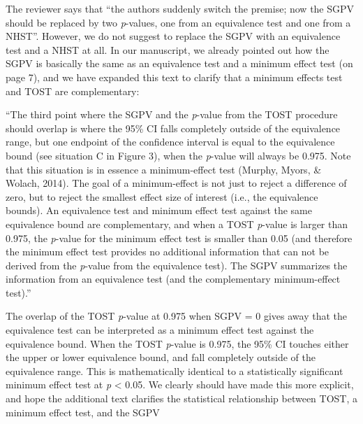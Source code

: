 \documentclass[man]{apa6}
\begin{document}
The reviewer says that \enquote{the authors suddenly switch the premise;
now the SGPV should be replaced by two \emph{p}-values, one from an
equivalence test and one from a NHST}. However, we do not suggest to
replace the SGPV with an equivalence test and a NHST at all. In our
manuscript, we already pointed out how the SGPV is basically the same as
an equivalence test and a minimum effect test (on page 7), and we have
expanded this text to clarify that a minimum effects test and TOST are
complementary:

\enquote{The third point where the SGPV and the \emph{p}-value from the
TOST procedure should overlap is where the 95\% CI falls completely
outside of the equivalence range, but one endpoint of the confidence
interval is equal to the equivalence bound (see situation C in Figure
3), when the \emph{p}-value will always be 0.975. Note that this
situation is in essence a minimum-effect test (Murphy, Myors, \& Wolach,
2014). The goal of a minimum-effect is not just to reject a difference
of zero, but to reject the smallest effect size of interest (i.e., the
equivalence bounds). An equivalence test and minimum effect test against
the same equivalence bound are complementary, and when a TOST
\emph{p}-value is larger than 0.975, the \emph{p}-value for the minimum
effect test is smaller than 0.05 (and therefore the minimum effect test
provides no additional information that can not be derived from the
\emph{p}-value from the equivalence test). The SGPV summarizes the
information from an equivalence test (and the complementary
minimum-effect test).}

The overlap of the TOST \emph{p}-value at 0.975 when SGPV = 0 gives away
that the equivalence test can be interpreted as a minimum effect test
against the equivalence bound. When the TOST \emph{p}-value is 0.975,
the 95\% CI touches either the upper or lower equivalence bound, and
fall completely outside of the equivalence range. This is mathematically
identical to a statistically significant minimum effect test at \emph{p}
\textless{} 0.05. We clearly should have made this more explicit, and
hope the additional text clarifies the statistical relationship between
TOST, a minimum effect test, and the SGPV
\end{document}
